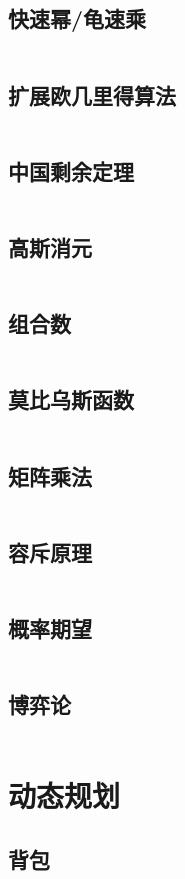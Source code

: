 \documentclass[a4paper,12pt]{article}
\begin{document}
\subsection{快速幂/龟速乘}
\inputminted[breaklines]{c++}{math/qmi.cc}
\subsection{扩展欧几里得算法}
\inputminted[breaklines]{c++}{math/exgcd.cc}
\subsection{中国剩余定理}
\inputminted[breaklines]{c++}{math/crt.cc}
\subsection{高斯消元}
\inputminted[breaklines]{c++}{math/gauss.cc}
\subsection{组合数}
\inputminted[breaklines]{c++}{math/combine.cc}
\subsection{莫比乌斯函数}
\inputminted[breaklines]{c++}{math/mobius.cc}
\subsection{矩阵乘法}
\inputminted[breaklines]{c++}{math/matrix.cc}
\subsection{容斥原理}
\inputminted[breaklines]{c++}{math/rongchi.cc}
\subsection{概率期望}
\inputminted[breaklines]{c++}{math/qiwang.cc}
\subsection{博弈论}
\inputminted[breaklines]{c++}{math/game.cc}

\newpage
\section{动态规划}
\subsection{背包}
\end{document}
